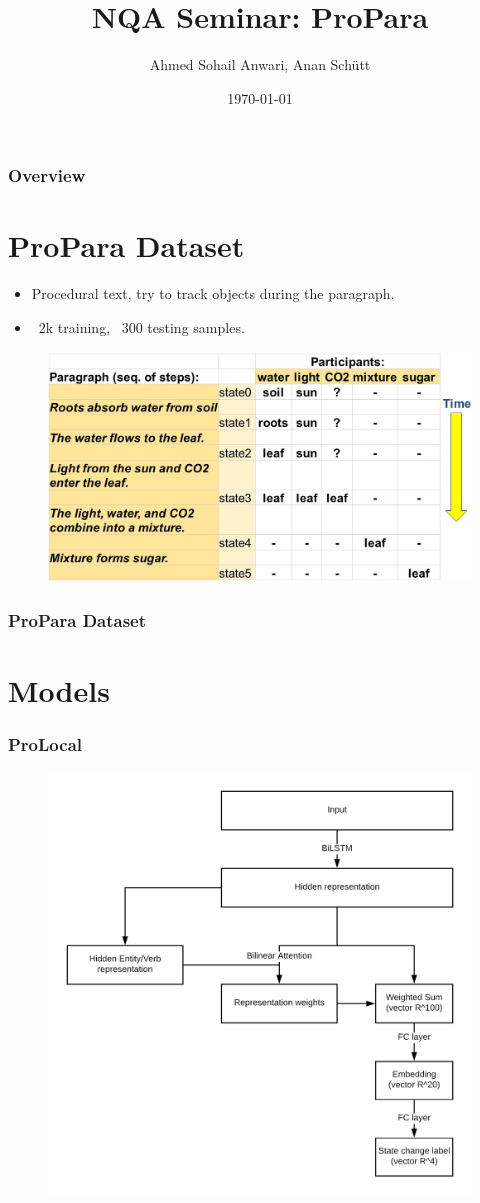 \documentclass{beamer}
\title[NQA Seminar]{NQA Seminar: ProPara} %
\author{Ahmed Sohail Anwari, Anan Sch{\"u}tt} %
\institute[UdS] %
{
University of Saarland\\ %
\medskip
\textit{s8ahanwa, s8anscue@stud.uni-saarland.de} %
}
\date{\today} %
\begin{document}
\begin{frame}
\titlepage
\end{frame}

\begin{frame}
\frametitle{Overview}
\tableofcontents
\end{frame}

\section{ProPara Dataset}
\begin{frame}
\begin{itemize}
\item Procedural text, try to track objects during the paragraph.
\item ~2k training, ~300 testing samples.
\end{itemize}
\begin{figure}[htp]
\centering
\includegraphics[width=.4\textwidth]{img/propara.jpg}
\end{figure}
\frametitle{ProPara Dataset}

\end{frame}

\section{Models}

\begin{frame}
\frametitle{ProLocal}
\begin{figure}[htp]
\centering
\includegraphics[width=.5\textwidth]{img/prolocal.png}
\end{figure}
\end{frame}
\end{document}
